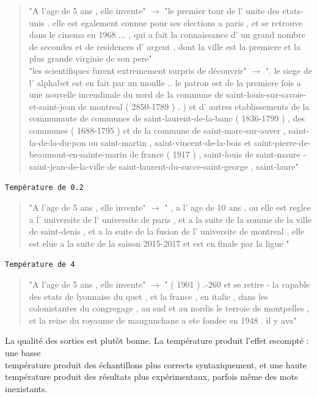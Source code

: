 \begin{quotation}
"A l'age de 5 ans , elle invente" $\rightarrow$ "le premier tour de l' unite des etats-unis . elle est egalement connue pour ses elections a paris , et se retrouve dans le cinema en 1968 ... , qui a fait la connaissance d' un grand nombre de secondes et de residences d' argent , dont la ville est la premiere et la plus grande virginie de son pere" \\


"les scientifiques furent extremement surpris de découvrir" $\rightarrow$ ". le siege de l' alphabet est en fait par un moulle .. le patron est de la premiere fois a une nouvelle incendinale du nord de la commune de saint-louis-sur-savoie-et-saint-jean de montreal ( 2850-1789 ) . ) et d' autres etablissements de la communaute de communes de saint-laurent-de-la-banc ( 1836-1799 ) , des communes ( 1688-1795 ) et de la commune de saint-marc-sur-auver , saint-la-de-la-du-pon ou saint-martin , saint-vincent-de-la-bois et saint-pierre-de-beaumont-en-sainte-marin de france ( 1917 ) , saint-louis de saint-maure - saint-jean-de-la-ville de saint-laurent-du-succe-saint-george , saint-laure"
\end{quotation}

\noindent{} \texttt{Température de 0.2}

\begin{quotation}
"A l'age de 5 ans , elle invente" $\rightarrow$ " , a l' age de 10 ans , ou elle est reglee a l' universite de l' universite de paris , et a la suite de la somme de la ville de saint-denis , et a la suite de la fusion de l' universite de montreal . elle est elue a la suite de la saison 2015-2017 et est en finale par la ligue "
\end{quotation}

\noindent{} \texttt{Température de 4}

\begin{quotation}
"A l'age de 5 ans , elle invente" $\rightarrow$ " ( 1901 ) .-260 et se retire - la capable des etats de lyonnaise du quet , et la france , en italie , dans les colonistantes du congregage , au sud et au nordis le terroie de montpelles , et la reine du royaume de maugunchane a ete fondee en 1948 . il y ava"
\end{quotation}

La qualité des sorties est plutôt bonne. La température produit l'effet
escompté : une basse \\
température produit des échantillons plus corrects
syntaxiquement, et une haute température produit des résultats plus
expérimentaux, parfois même des mots inexistants. \\

